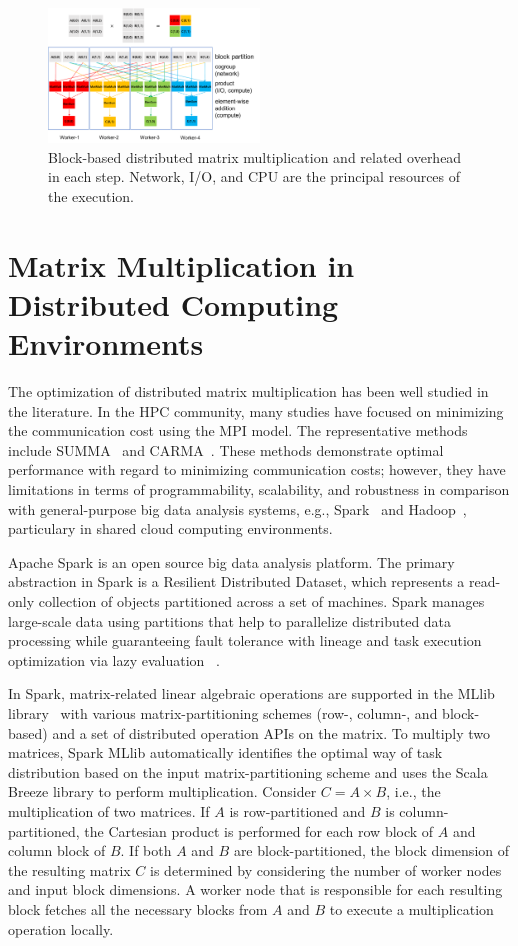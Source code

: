 \documentclass[10pt, conference, compsocconf]{IEEEtran}
\begin{document}
\begin{figure}[ht]
	\centering\includegraphics[width=0.5\textwidth]{figures/matmult-overhead-non-square-1.pdf}\caption{Block-based distributed matrix multiplication and related overhead in each step. Network, I/O, and CPU are the principal resources of the execution.}\label{fig:matmul-with-overhead}
\end{figure}

\section{Matrix Multiplication in Distributed Computing Environments}\label{sec:distributed-matrix-computation}
The optimization of distributed matrix multiplication has been well studied in the literature. In the HPC community, many studies have focused on minimizing the communication cost using the MPI model. The representative methods include SUMMA~\cite{summa} and CARMA~\cite{carma}. These methods demonstrate optimal performance with regard to minimizing communication costs; however, they have limitations in terms of programmability, scalability, and robustness in comparison with general-purpose big data analysis systems, e.g., Spark~\cite{spark} and Hadoop~\cite{hadoop}, particulary in shared cloud computing environments.

Apache Spark is an open source big data analysis platform. The primary abstraction in Spark is a Resilient Distributed Dataset, which represents a read-only collection of objects partitioned across a set of machines. Spark manages large-scale data using partitions that help to parallelize distributed data processing while guaranteeing fault tolerance with lineage and task execution optimization via lazy evaluation ~\cite{spark}.

In Spark, matrix-related linear algebraic operations are supported in the MLlib library~\cite{spark-mm} with various matrix-partitioning schemes (row-, column-, and block-based) and a set of distributed operation APIs on the matrix. To multiply two matrices, Spark MLlib automatically identifies the optimal way of task distribution based on the input matrix-partitioning scheme and uses the Scala Breeze library to perform multiplication. Consider $C = A \times B$, i.e., the multiplication of two matrices. If $A$ is row-partitioned and $B$ is column-partitioned, the Cartesian product is performed for each row block of $A$ and column block of $B$. If both $A$ and $B$ are block-partitioned, the block dimension of the resulting matrix $C$ is determined by considering the number of worker nodes and input block dimensions. A worker node that is responsible for each resulting block fetches all the necessary blocks from $A$ and $B$ to execute a multiplication operation locally.
\end{document}
